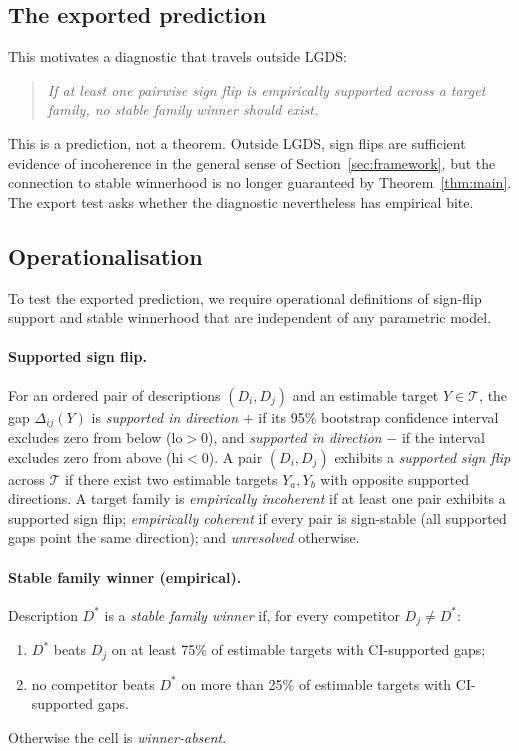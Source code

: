 \documentclass[11pt]{article}
\begin{document}
\subsection{The exported prediction}

This motivates a diagnostic that travels outside LGDS:

\begin{quote}
\emph{If at least one pairwise sign flip is empirically supported across a
target family, no stable family winner should exist.}
\end{quote}

This is a prediction, not a theorem.
Outside LGDS, sign flips are sufficient evidence of incoherence in the
general sense of Section~\ref{sec:framework}, but the connection to stable
winnerhood is no longer guaranteed by Theorem~\ref{thm:main}.
The export test asks whether the diagnostic nevertheless has empirical bite.

\subsection{Operationalisation}

To test the exported prediction, we require operational definitions of
sign-flip support and stable winnerhood that are independent of any
parametric model.

\paragraph{Supported sign flip.}
For an ordered pair of descriptions $(D_i, D_j)$ and an estimable target
$Y \in \mathcal{T}$, the gap $\Delta_{ij}(Y)$ is \emph{supported in
direction} $+$ if its 95\% bootstrap confidence interval excludes zero from
below ($\mathrm{lo} > 0$), and \emph{supported in direction} $-$ if the
interval excludes zero from above ($\mathrm{hi} < 0$).
A pair $(D_i, D_j)$ exhibits a \emph{supported sign flip} across $\mathcal{T}$
if there exist two estimable targets $Y_a, Y_b$ with opposite supported
directions.
A target family is \emph{empirically incoherent} if at least one pair
exhibits a supported sign flip; \emph{empirically coherent} if every pair
is sign-stable (all supported gaps point the same direction);
and \emph{unresolved} otherwise.

\paragraph{Stable family winner (empirical).}
Description $D^*$ is a \emph{stable family winner} if, for every competitor
$D_j \neq D^*$:
\begin{enumerate}[label=(\roman*)]
    \item $D^*$ beats $D_j$ on at least 75\% of estimable targets
          with CI-supported gaps;
    \item no competitor beats $D^*$ on more than 25\% of estimable targets
          with CI-supported gaps.
\end{enumerate}
Otherwise the cell is \emph{winner-absent}.
\end{document}
